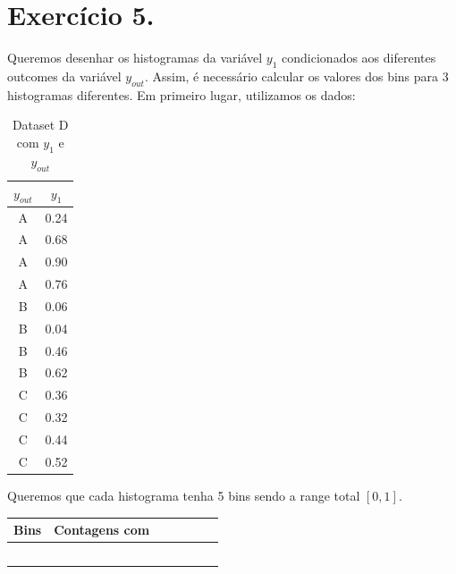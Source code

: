 \documentclass{article}
\begin{document}
\section{Exercício 5.}

Queremos desenhar os histogramas da variável $y_1$ condicionados aos diferentes outcomes da variável $y_{out}$. 
Assim, é necessário calcular os valores dos bins para 3 histogramas diferentes. Em primeiro lugar, utilizamos os dados:

\begin{table}[h!]
  \centering
  \begin{tabular}{|c|c|}
    \hline
    $y_{out}$ & $y_1$ \\ \hline
    A         & 0.24  \\ \hline
    A         & 0.68  \\ \hline
    A         & 0.90  \\ \hline
    A         & 0.76  \\ \hline
    B         & 0.06  \\ \hline
    B         & 0.04  \\ \hline
    B         & 0.46  \\ \hline
    B         & 0.62  \\ \hline
    C         & 0.36  \\ \hline
    C         & 0.32  \\ \hline
    C         & 0.44  \\ \hline
    C         & 0.52  \\ \hline
  \end{tabular}
  \caption{Dataset D com $y_1$ e $y_{out}$}
  \label{tab:datasetD_y1_yout}
\end{table}

Queremos que cada histograma tenha 5 bins sendo a range total $[0,1]$. 

\begin{table}[]
  \begin{tabular}{|l|l|l|l|l|l|l|}
  \hline
  Bins & Contagens com &  &  &  &  &  \\ \hline
       &               &  &  &  &  &  \\ \hline
       &               &  &  &  &  &  \\ \hline
       &               &  &  &  &  &  \\ \hline
       &               &  &  &  &  &  \\ \hline
       &               &  &  &  &  &  \\ \hline
  \end{tabular}
  \end{table}
\end{document}
